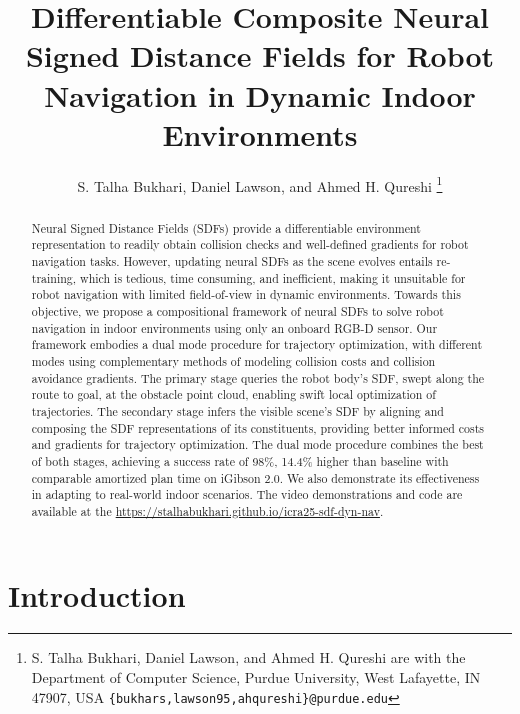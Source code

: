 \documentclass[letterpaper, 10 pt, conference]{ieeeconf}  %
\begin{document}
\title{\LARGE\bf
    Differentiable Composite Neural Signed Distance Fields for Robot Navigation in Dynamic Indoor Environments
}

\author{S. Talha Bukhari, Daniel Lawson, and Ahmed H. Qureshi%
    \thanks{
        S. Talha Bukhari, Daniel Lawson, and Ahmed H. Qureshi are with the Department of Computer Science, Purdue University, West Lafayette, IN 47907, USA
        {\tt\small \{bukhars,lawson95,ahqureshi\}@purdue.edu}
    }%
}

\maketitle


\begin{abstract}
Neural Signed Distance Fields (SDFs) provide a differentiable environment representation to readily obtain collision checks and well-defined gradients for robot navigation tasks.
However, updating neural SDFs as the scene evolves entails re-training, which is tedious, time consuming, and inefficient, making it unsuitable for robot navigation with limited field-of-view in dynamic environments.
Towards this objective, we propose a compositional framework of neural SDFs to solve robot navigation in indoor environments using only an onboard RGB-D sensor.
Our framework embodies a dual mode procedure for trajectory optimization, with different modes using complementary methods of modeling collision costs and collision avoidance gradients.
The primary stage queries the robot body's SDF, swept along the route to goal, at the obstacle point cloud, enabling swift local optimization of trajectories.
The secondary stage infers the visible scene's SDF by aligning and composing the SDF representations of its constituents, providing better informed costs and gradients for trajectory optimization.
The dual mode procedure combines the best of both stages, achieving a success rate of 98\%, 14.4\% higher than baseline with comparable amortized plan time on iGibson 2.0.
We also demonstrate its effectiveness in adapting to real-world indoor scenarios.
The video demonstrations and code are available at the \url{https://stalhabukhari.github.io/icra25-sdf-dyn-nav}.
\end{abstract}



\section{Introduction}
\end{document}
